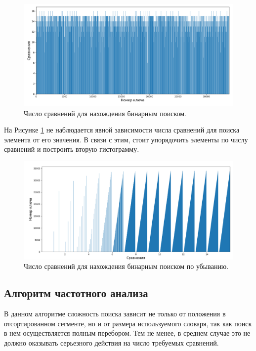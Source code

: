 \documentclass[12pt]{report}
\begin{document}
	\begin{figure}[H]
		\begin{center}
			\includegraphics[width=0.8\linewidth]{img/bin_keys}
			\caption{Число сравнений для нахождения бинарным поиском.}
			\label{img:bin}
		\end{center}
	\end{figure}
	
	На Рисунке \ref{img:bin} не наблюдается явной зависимости числа сравнений для поиска элемента от его значения. В связи с этим, стоит упорядочить элементы по числу сравнений и построить вторую гистограмму.
	
	\begin{figure}[H]
		\begin{center}
			\includegraphics[width=0.8\linewidth]{img/bin_comp.png}
			\caption{Число сравнений для нахождения бинарным поиском по убыванию.}
			\label{img:bin_sorted}
		\end{center}
	\end{figure}
	
	\subsection{Алгоритм частотного анализа}
	
	В данном алгоритме сложность поиска зависит не только от положения в отсортированном сегменте, но и от размера используемого словаря, так как поиск в нем осуществляется полным перебором. Тем не менее, в среднем случае это не должно оказывать серьезного действия на число требуемых сравнений.
	
\end{document}
